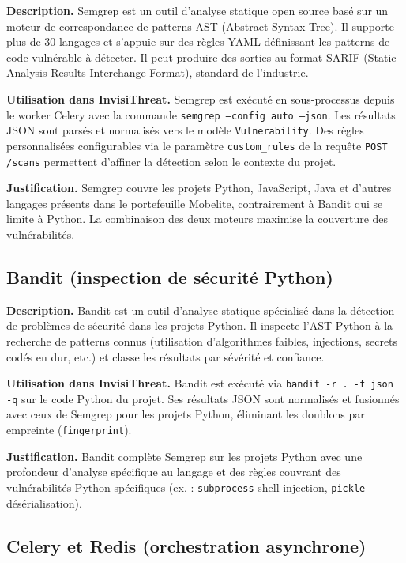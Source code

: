 \textbf{Description.} Semgrep est un outil d'analyse statique open source basé sur un moteur de correspondance de patterns AST (Abstract Syntax Tree). Il supporte plus de 30 langages et s'appuie sur des règles YAML définissant les patterns de code vulnérable à détecter. Il peut produire des sorties au format SARIF (Static Analysis Results Interchange Format), standard de l'industrie.

\textbf{Utilisation dans InvisiThreat.} Semgrep est exécuté en sous-processus depuis le worker Celery avec la commande \texttt{semgrep --config auto --json}. Les résultats JSON sont parsés et normalisés vers le modèle \texttt{Vulnerability}. Des règles personnalisées configurables via le paramètre \texttt{custom\_rules} de la requête \texttt{POST /scans} permettent d'affiner la détection selon le contexte du projet.

\textbf{Justification.} Semgrep couvre les projets Python, JavaScript, Java et d'autres langages présents dans le portefeuille Mobelite, contrairement à Bandit qui se limite à Python. La combinaison des deux moteurs maximise la couverture des vulnérabilités.

\subsection{Bandit (inspection de sécurité Python)}

\textbf{Description.} Bandit est un outil d'analyse statique spécialisé dans la détection de problèmes de sécurité dans les projets Python. Il inspecte l'AST Python à la recherche de patterns connus (utilisation d'algorithmes faibles, injections, secrets codés en dur, etc.) et classe les résultats par sévérité et confiance.

\textbf{Utilisation dans InvisiThreat.} Bandit est exécuté via \texttt{bandit -r . -f json -q} sur le code Python du projet. Ses résultats JSON sont normalisés et fusionnés avec ceux de Semgrep pour les projets Python, éliminant les doublons par empreinte (\texttt{fingerprint}).

\textbf{Justification.} Bandit complète Semgrep sur les projets Python avec une profondeur d'analyse spécifique au langage et des règles couvrant des vulnérabilités Python-spécifiques (ex. : \texttt{subprocess} shell injection, \texttt{pickle} désérialisation).

\subsection{Celery et Redis (orchestration asynchrone)}

